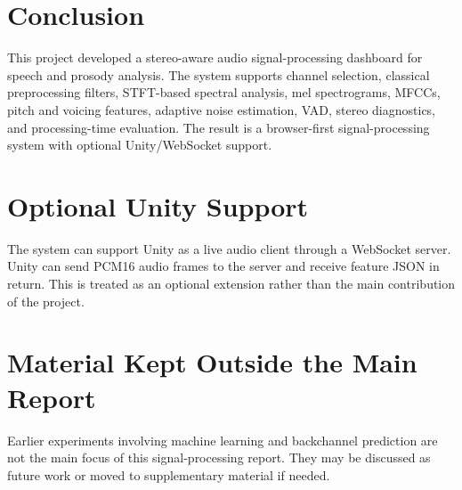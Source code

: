 \documentclass[11pt,a4paper]{article}
\begin{document}
\section{Conclusion}
This project developed a stereo-aware audio signal-processing dashboard for speech and prosody analysis. The system supports channel selection, classical preprocessing filters, STFT-based spectral analysis, mel spectrograms, MFCCs, pitch and voicing features, adaptive noise estimation, VAD, stereo diagnostics, and processing-time evaluation. The result is a browser-first signal-processing system with optional Unity/WebSocket support.

\appendix
\section{Optional Unity Support}
The system can support Unity as a live audio client through a WebSocket server. Unity can send PCM16 audio frames to the server and receive feature JSON in return. This is treated as an optional extension rather than the main contribution of the project.

\section{Material Kept Outside the Main Report}
Earlier experiments involving machine learning and backchannel prediction are not the main focus of this signal-processing report. They may be discussed as future work or moved to supplementary material if needed.



\end{document}
